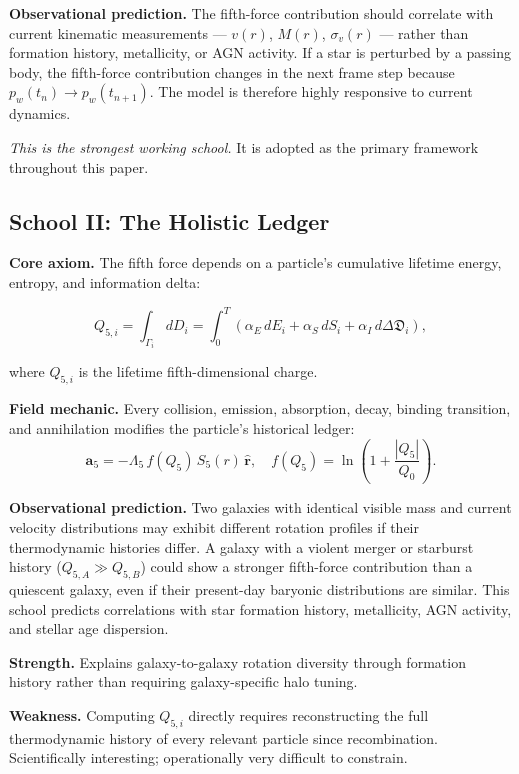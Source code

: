\documentclass[11pt,a4paper]{article}
\newcommand{\pw}{p_w}                        %
\newcommand{\Lf}{\Lambda_5}                  %
\newcommand{\afive}{\mathbf{a}_5}            %
\newcommand{\Sfive}{S_5}                     %
\newcommand{\rhat}{\hat{\mathbf{r}}}         %
\newcommand{\InfoD}{\Delta\mathfrak{D}}      %
\begin{document}
\textbf{Observational prediction.} The fifth-force contribution should
correlate with current kinematic measurements --- $v(r)$, $M(r)$,
$\sigma_v(r)$ --- rather than formation history, metallicity, or AGN activity.
If a star is perturbed by a passing body, the fifth-force contribution changes
in the next frame step because $\pw(t_n) \to \pw(t_{n+1})$.  The model is
therefore highly responsive to current dynamics.

\textit{This is the strongest working school.}  It is adopted as the primary
framework throughout this paper.

\subsection{School II: The Holistic Ledger}\label{sec:school2}

\textbf{Core axiom.} The fifth force depends on a particle's cumulative
lifetime energy, entropy, and information delta:

\[
  Q_{5,i} = \int_{\Gamma_i} dD_i
  = \int_0^T \!\!\left(\alpha_E\,dE_i + \alpha_S\,dS_i + \alpha_I\,d\InfoD_i\right) ,
\]

where $Q_{5,i}$ is the lifetime fifth-dimensional charge.

\textbf{Field mechanic.} Every collision, emission, absorption, decay,
binding transition, and annihilation modifies the particle's historical
ledger:
\[
  \afive = -\Lf\,f(Q_5)\,\Sfive(r)\,\rhat ,
  \quad
  f(Q_5) = \ln\!\left(1+\frac{|Q_5|}{Q_0}\right) .
\]

\textbf{Observational prediction.} Two galaxies with identical visible mass
and current velocity distributions may exhibit different rotation profiles
if their thermodynamic histories differ.  A galaxy with a violent merger or
starburst history ($Q_{5,A} \gg Q_{5,B}$) could show a stronger fifth-force
contribution than a quiescent galaxy, even if their present-day baryonic
distributions are similar.  This school predicts correlations with star
formation history, metallicity, AGN activity, and stellar age dispersion.

\textbf{Strength.} Explains galaxy-to-galaxy rotation diversity through
formation history rather than requiring galaxy-specific halo tuning.

\textbf{Weakness.} Computing $Q_{5,i}$ directly requires reconstructing the
full thermodynamic history of every relevant particle since recombination.
Scientifically interesting; operationally very difficult to constrain.
\end{document}
